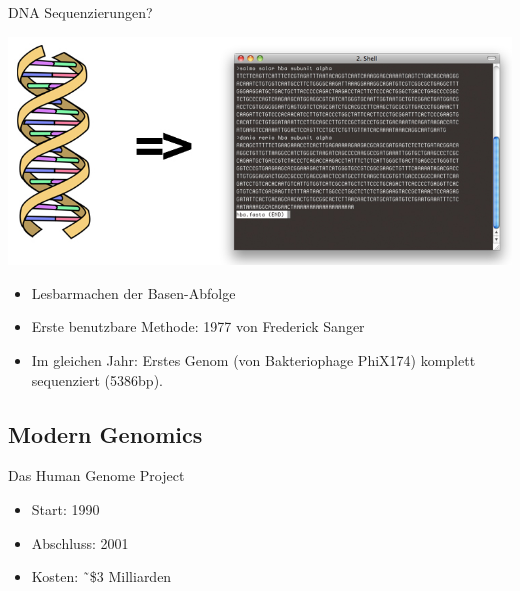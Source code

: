 \documentclass[12pt,a4paper]{beamer}
\begin{document}
\begin{frame}{DNA Sequenzierungen?}
	\begin{center}
	\includegraphics[scale=0.4]{dna_to_text.jpg} \\
	\end{center}
	\begin{itemize}
		\item Lesbarmachen der Basen-Abfolge
		\pause \item Erste benutzbare Methode: 1977 von Frederick Sanger
		\pause \item Im gleichen Jahr: Erstes Genom (von Bakteriophage PhiX174) komplett sequenziert (5386bp).
	\end{itemize}
\end{frame}

\subsection{Modern Genomics}

\begin{frame}{Das Human Genome Project}
	\begin{itemize}
		\item Start: 1990
		\pause \item Abschluss: 2001
		\pause \item Kosten: \~\ \$3 Milliarden 
	\end{itemize}
\end{frame} 
\end{document}
